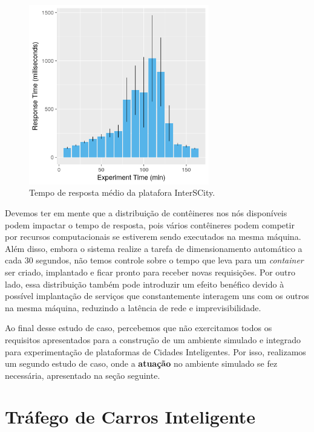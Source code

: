 \begin{figure}[ht]
	\centering
	\includegraphics[width=0.7\textwidth]{figuras/response_time_mean.png}
    \caption{Tempo de resposta médio da platafora InterSCity.}
	\label{fig:responsetime}
\end{figure}


Devemos ter em mente que a distribuição de contêineres nos nós disponíveis podem impactar o tempo de resposta, pois vários contêineres podem competir por recursos computacionais se estiverem
sendo executados na mesma máquina.
Além disso, embora o sistema realize a tarefa de dimensionamento automático a cada 30 segundos, não temos controle sobre o tempo que leva para um \textit{container} ser criado, implantado e ficar pronto
para receber novas requisições.
Por outro lado, essa distribuição também pode introduzir um efeito benéfico devido à possível implantação de serviços que constantemente interagem uns com os outros na mesma máquina, reduzindo a latência
de rede e imprevisibilidade.

Ao final desse estudo de caso, percebemos que não exercitamos todos os requisitos apresentados para a construção de um ambiente simulado e integrado para experimentação de plataformas de Cidades Inteligentes.
Por isso, realizamos um segundo estudo de caso, onde a \textbf{atuação} no ambiente simulado se fez necessária, apresentado na seção seguinte.

\section{Tráfego de Carros Inteligente}

